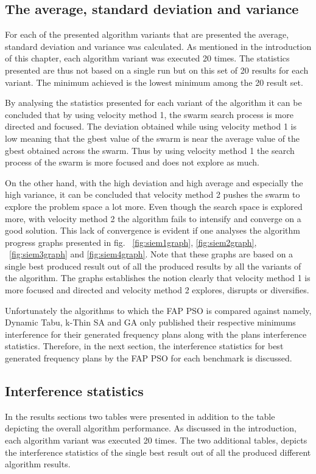 \subsection{The average, standard deviation and variance}
For each of the presented algorithm variants that are presented the average, standard deviation and variance was calculated. As mentioned in the introduction of this chapter, each algorithm variant was executed 20 times. The statistics presented are thus not based on a single run but on this set of 20 results for each variant. The minimum achieved is the lowest minimum among the 20 result set.

By analysing the statistics presented for each variant of the algorithm it can be concluded that by using velocity method 1, the swarm search process is more directed and focused. The deviation obtained while using velocity method 1 is low meaning that the gbest value of the swarm is near the average value of the gbest obtained across the swarm. Thus by using velocity method 1 the search process of the swarm is more focused and does not explore as much.

On the other hand, with the high deviation and high average and especially the high variance, it can be concluded that velocity method 2 pushes the swarm to explore the problem space a lot more. Even though the search space is explored more, with velocity method 2 the algorithm fails to intensify and converge on a good solution. This lack of convergence is evident if one analyses the algorithm progress graphs presented in fig. ~\ref{fig:siem1graph}, \ref{fig:siem2graph}, ~\ref{fig:siem3graph} and \ref{fig:siem4graph}. Note that these graphs are based on a single best produced result out of all the produced results by all the variants of the algorithm. The graphs establishes the notion clearly that velocity method 1 is more focused and directed and velocity method 2 explores, disrupts or diversifies.

Unfortunately the algorithms to which the FAP PSO is compared against namely, Dynamic Tabu, k-Thin SA and GA only published their respective minimums interference for their generated frequency plans along with the plans interference statistics. Therefore, in the next section, the interference statistics for best generated frequency plans by the FAP PSO for each benchmark is discussed.

\subsection{Interference statistics}
In the results sections two tables were presented in addition to the table depicting the overall algorithm performance. As discussed in the introduction, each algorithm variant was executed 20 times. The two additional tables, depicts the interference statistics of the single best result out of all the produced different algorithm results.

